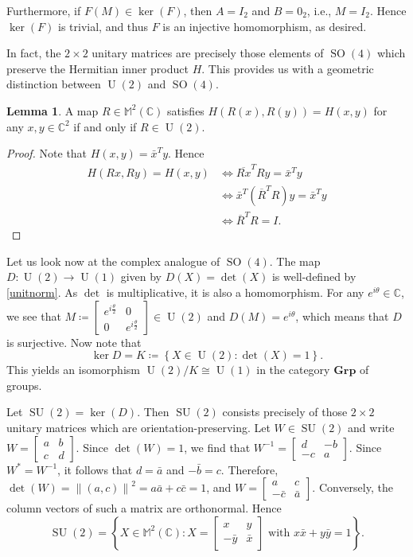 \documentclass[10pt,letterpaper,cm]{nupset}
\theoremstyle{definition}
\theoremstyle{theorem}
\newtheorem{lemma}[definition]{Lemma}
\theoremstyle{remark}
\newcommand{\C}{\mathbb C}
\newcommand{\M}{\mathbb M}
\newcommand{\1}{\mathbf{1}}
\newcommand{\0}{\vec {0}}
\DeclareMathOperator{\SO}{SO}
\DeclareMathOperator{\SU}{SU}
\DeclareMathOperator{\U}{U}
\begin{document}
Furthermore, if $F(M)\in \ker(F)$, then $A=I_2$ and $B=0_{2}$, i.e., $M=I_2$. Hence $\ker(F)$ is trivial, and thus $F$ is an injective homomorphism, as desired. 



In fact, the  $2\times 2$ unitary matrices are precisely those elements of $\SO(4)$ which preserve the Hermitian inner product $H$. This provides us with a geometric distinction between $\U(2)$ and $\SO(4)$.

\begin{lemma}\label{l18}
A map $R\in \M^2(\C)$ satisfies $H(R(x), R(y))=H(x,y)$ for any $x,y\in \C^2$ if and only if  $R\in \U(2)$.
\end{lemma}

\begin{proof}
Note that $H(x,y)=\bar{x}^Ty$. Hence 
\begin{align*}
H(Rx, Ry)=H(x,y) & \iff \overline{Rx}^TRy=\bar{x}^Ty
\\ & \iff \bar{x}^T(\overline{R}^TR)y=\bar{x}^Ty 
\\ & \iff \overline{R}^TR =I.
\end{align*}
\end{proof}

\smallskip

Let us look now at the complex analogue of $\SO(4)$. The map $D:\U(2)\to \U(1)$ given by $D(X)=\det(X)$ is well-defined by \cref{unitnorm}. As $\det$ is multiplicative, it is also a homomorphism. For any $e^{i\theta}\in \C$, we see that $M\coloneqq\begin{bmatrix}e^{i\frac{\theta}{2}} & 0 \\ 0 & e^{i\frac{\theta}{2}} \end{bmatrix}\in \U(2)$ and $D(M)=e^{i\theta}$, which means that $D$ is surjective. Now note that $$\ker D=K\coloneqq\left\{X\in \U(2) :\det(X)=1\right\}.$$ This yields an isomorphism $\U(2)/K\cong \U(1)$ in the category $\mathbf{Grp}$ of groups. 

Let $\SU(2)= \ker(D)$. Then $\SU(2)$ consists precisely of those $2\times 2$ unitary matrices which are orientation-preserving.
Let $W\in \SU(2)$ and write $W=\begin{bmatrix} a & b \\ c & d \end{bmatrix}$. Since $\det(W)=1$, we find that $W^{-1}=\begin{bmatrix} d & {-b} \\ {-c} & a \end{bmatrix}$. Since $W^\ast= W^{-1}$, it follows that $d=\bar{a}$ and ${-\bar{b}} ={c}$. Therefore, $\det(W)= \left\lVert{(a,c)}\right\rVert^2=a\bar{a}+c\bar{c}=1$, and $W=\begin{bmatrix} a & c\\ {-\bar{c}} & \bar{a} \end{bmatrix}$. Conversely, the column vectors of such a matrix are orthonormal. Hence $$\SU(2)= \left\{X\in \M^2(\C): X=  \begin{bmatrix} x & {y}\\ {-\bar{y}} & \bar{x} \end{bmatrix} \text{ with } x\bar{x}+y\bar{y}=1\right\}.$$
\end{document}
